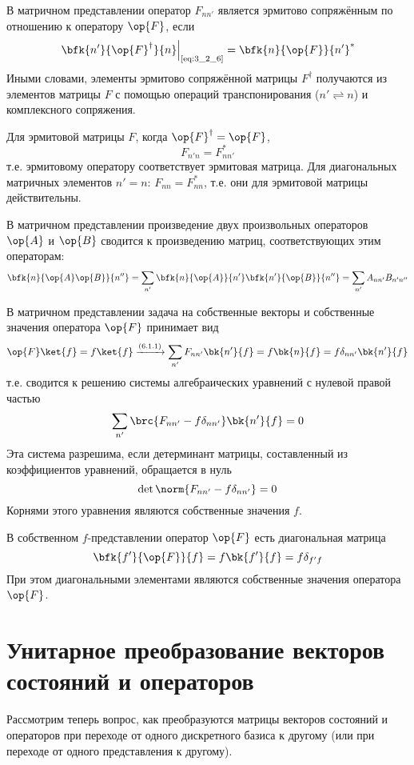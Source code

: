 В матричном представлении оператор $F_{nn'}$ является эрмитово сопряжённым по отношению к оператору $\op{F}$, если
$$
\left .\bfk{n'}{\op{F}^\dag}{n}\right|_{\text{\eqref{eq:3_2_6}}} = \bfk{n}{\op{F}}{n'}^*
$$%
%
Иными словами, элементы эрмитово сопряжённой матрицы $F^\dag$ получаются из элементов матрицы $F$ с помощью операций транспонирования ($n' \rightleftharpoons n $) и комплексного сопряжения.

Для эрмитовой матрицы $F$, когда $\op{F}^\dag = \op{F}$,
$$
F_{n'n}=F_{nn'}^*
$$%
%
т.е. эрмитовому оператору соответствует эрмитовая матрица. Для диагональных матричных элементов $n' = n$: $F_{nn} = F^*_{nn}$, т.е. они для эрмитовой матрицы действительны.

В матричном представлении произведение двух произвольных операторов $\op{A}$ и $\op{B}$ сводится к произведению матриц, соответствующих этим операторам:%
$$
\bfk{n}{\op{A}\op{B}}{n''} =
	\sum_{n'} \bfk{n}{\op{A}}{n'} \bfk{n'}{\op{B}}{n''} =
	\sum_{n'} A_{nn'} B_{n'n''}
$$

В матричном представлении задача на собственные векторы и собственные значения оператора $\op{F}$ принимает вид%
$$
\op{F}\ket{f}=f\ket{f} \xrightarrow{(6.1.1)} \sum_{n'} F_{nn'} \bk{n'}{f} = f\bk{n}{f}=f\delta_{nn'}\bk{n'}{f}
$$%
%
т.е. сводится к решению системы алгебраических уравнений с нулевой правой частью%
%
$$
\sum_{n'}\brc{F_{nn'}-f\delta_{nn'}}\bk{n'}{f}=0
$$%
%
Эта система разрешима, если детерминант матрицы, составленный из коэффициентов уравнений, обращается в нуль%
%
$$
\det{\norm{F_{nn'}-f\delta_{nn'}}}=0
$$%
%
Корнями этого уравнения являются собственные значения $f$.

В собственном $f$-представлении оператор $\op{F}$ есть диагональная матрица%
%
$$
\bfk{f'}{\op{F}}{f}=f\bk{f'}{f}=f\delta_{f'f}
$$%
%
При этом диагональными элементами являются собственные значения оператора $\op{F}$.


\section{Унитарное преобразование векторов состояний и операторов}

Рассмотрим теперь вопрос, как преобразуются матрицы векторов состояний и операторов при переходе от одного дискретного базиса к другому (или при переходе от одного представления к другому).

